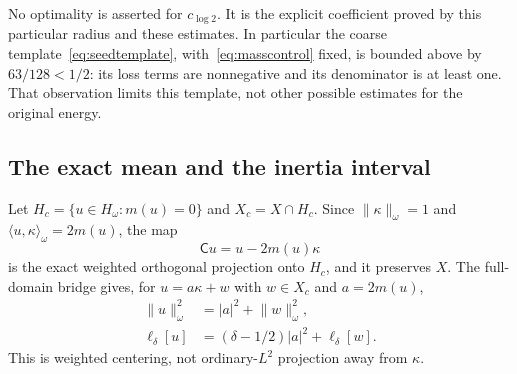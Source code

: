 \documentclass[11pt,a4paper]{article}
\numberwithin{equation}{section}
\theoremstyle{remark}
\newcommand{\Hw}{H_\omega}
\newcommand{\ip}[2]{\langle #1,#2\rangle}
\newcommand{\norm}[1]{\lVert #1\rVert}
\begin{document}
No optimality is asserted for $c_{\log2}$. It is the explicit coefficient proved by this particular radius and these estimates. In particular the coarse template~\eqref{eq:seedtemplate}, with~\eqref{eq:masscontrol} fixed, is bounded above by $63/128<1/2$: its loss terms are nonnegative and its denominator is at least one. That observation limits this template, not other possible estimates for the original energy.

\subsection{The exact mean and the inertia interval}

Let $H_c=\{u\in\Hw:m(u)=0\}$ and $X_c=X\cap H_c$. Since
$\norm\kappa_\omega=1$ and $\ip u\kappa_\omega=2m(u)$, the map
\begin{equation}\label{eq:centering}
 \mathsf C u=u-2m(u)\kappa
\end{equation}
is the exact weighted orthogonal projection onto $H_c$, and it preserves $X$. The full-domain bridge gives, for $u=a\kappa+w$ with $w\in X_c$ and $a=2m(u)$,
\begin{align}
 \norm u_\omega^2&=|a|^2+\norm w_\omega^2,\label{eq:meansplitnorm}\\
 \ell_\delta[u]&=(\delta-1/2)|a|^2+\ell_\delta[w].\label{eq:meansplit}
\end{align}
This is weighted centering, not ordinary-$L^2$ projection away from $\kappa$.
\end{document}
